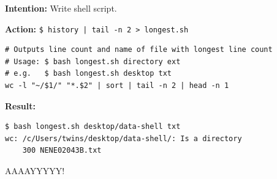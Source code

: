 \documentclass[12pt]{article}
\begin{document}
\begin{addmargin}[1cm]{0cm}
\textbf{Intention:} Write shell script.

\textbf{Action:} \texttt{\$ history | tail -n 2 > longest.sh}
\vspace{-1em}\begin{verbatim}
# Outputs line count and name of file with longest line count
# Usage: $ bash longest.sh directory ext
# e.g.   $ bash longest.sh desktop txt
wc -l "~/$1/" "*.$2" | sort | tail -n 2 | head -n 1
\end{verbatim}\vspace{-1em}

\textbf{Result:}
\vspace{-1em}\begin{verbatim}
$ bash longest.sh desktop/data-shell txt
wc: /c/Users/twins/desktop/data-shell/: Is a directory
    300 NENE02043B.txt
\end{verbatim}


AAAAYYYYY!
\end{addmargin}

\newpage
\end{document}
